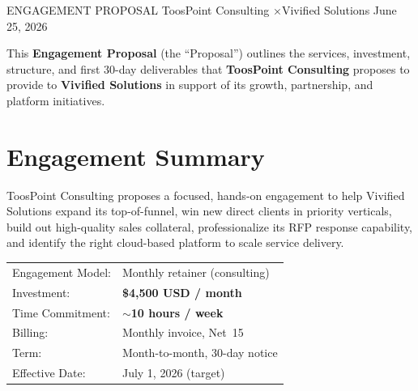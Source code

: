 \documentclass{toospoint}
\begin{document}
\contracttitle
  {ENGAGEMENT PROPOSAL}
  {ToosPoint Consulting \quad×\quad Vivified Solutions}
  {June 25, 2026}

\begin{clausebox}
\sffamily\small
This \textbf{Engagement Proposal} (the ``Proposal'') outlines the services,
investment, structure, and first 30-day deliverables that \textbf{ToosPoint
Consulting} proposes to provide to \textbf{Vivified Solutions} in support of
its growth, partnership, and platform initiatives.
\end{clausebox}

\vspace{10pt}

\section{Engagement Summary}

ToosPoint Consulting proposes a focused, hands-on engagement to help Vivified
Solutions expand its top-of-funnel, win new direct clients in priority
verticals, build out high-quality sales collateral, professionalize its RFP
response capability, and identify the right cloud-based platform to scale
service delivery.

\vspace{4pt}
\begin{mdframed}[
  linecolor=TPBorder,
  linewidth=1pt,
  roundcorner=4pt,
  backgroundcolor=TPLight,
  innerleftmargin=14pt,
  innerrightmargin=14pt,
  innertopmargin=10pt,
  innerbottommargin=10pt
]
\sffamily\small
\begin{tabular}{@{}p{}p{}@{}}
  \textcolor{TPGray}{Engagement Model:}  & Monthly retainer (consulting) \\[3pt]
  \textcolor{TPGray}{Investment:}        & \textbf{\$4{,}500 USD / month} \\[3pt]
  \textcolor{TPGray}{Time Commitment:}   & \textbf{$\sim$10 hours / week} \\[3pt]
  \textcolor{TPGray}{Billing:}           & Monthly invoice, Net~15 \\[3pt]
  \textcolor{TPGray}{Term:}              & Month-to-month, 30-day notice \\[3pt]
  \textcolor{TPGray}{Effective Date:}    & July 1, 2026 (target) \\
\end{tabular}
\end{mdframed}
\end{document}
